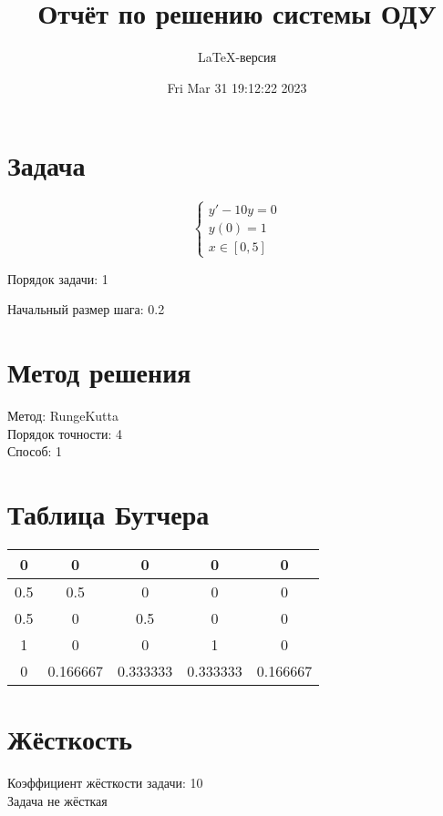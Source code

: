 \documentclass[a4paper,14pt]{extarticle}
\title{Отчёт по решению системы ОДУ}
\author{LaTeX-версия}
\date{Fri Mar 31 19:12:22 2023}
\begin{document}
\maketitle

\tableofcontents
\pagebreak

\section{Задача}

$$
\begin{cases}
	y' - 10y = 0\\
	y(0) = 1\\
	x \in [0, 5]
\end{cases}
$$

Порядок задачи: 1

Начальный размер шага: 0.2

\section{Метод решения}

Метод: RungeKutta\\
Порядок точности: 4\\
Способ: 1

\section{Таблица Бутчера}

\begin{table}[h]
\centering
\begin{tabular}{|c||c|c|c|c|}
\hline
0 & 0 & 0 & 0 & 0\\
\hline
0.5 & 0.5 & 0 & 0 & 0\\
\hline
0.5 & 0 & 0.5 & 0 & 0\\
\hline
1 & 0 & 0 & 1 & 0\\
\hline
0 & \cellcolor{lightgray} 0.166667 & \cellcolor{lightgray} 0.333333 & \cellcolor{lightgray} 0.333333 & \cellcolor{lightgray} 0.166667\\
\hline
\end{tabular}
\end{table}

\section{Жёсткость}

Коэффициент жёсткости задачи: 10\\
Задача не жёсткая
\end{document}
